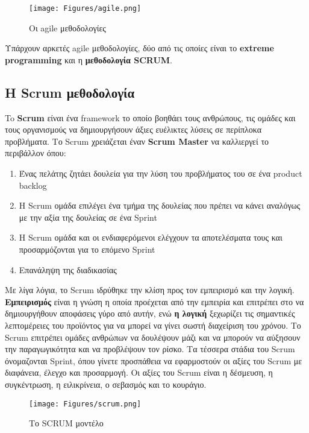 \begin{figure}[th]
    \centering
    \texttt{[image: Figures/agile.png]}
    \caption[Οι agile μεθοδολογίες]{Οι agile μεθοδολογίες}
    \label{fig:agile}
\end{figure}

Υπάρχουν αρκετές agile μεθοδολογίες, δύο από τις οποίες είναι το \textbf{extreme programming} και η \textbf{μεθοδολογία SCRUM}.

\subsection{Η Scrum μεθοδολογία}

To \textbf{Scrum} είναι ένα framework το οποίο βοηθάει τους ανθρώπους, τις ομάδες και τους οργανισμούς να δημιουργήσουν άξιες ευέλικτες λύσεις σε περίπλοκα προβλήματα. 
Το Scrum χρειάζεται έναν \textbf{Scrum Master} να καλλιεργεί το περιβάλλον όπου:

\begin{enumerate}
    \item Ένας πελάτης ζητάει δουλεία για την λύση του προβλήματος του σε ένα product backlog
    \item Η Scrum ομάδα επιλέγει ένα τμήμα της δουλείας που πρέπει να κάνει αναλόγως με την αξία της δουλείας σε ένα Sprint
    \item Η Scrum ομάδα και οι ενδιαφερόμενοι ελέγχουν τα αποτελέσματα τους και προσαρμόζονται για το επόμενο Sprint
    \item Επανάληψη της διαδικασίας
\end{enumerate}

Με λίγα λόγια, το Scrum ιδρύθηκε την κλίση προς τον εμπειρισμό και την λογική. 
\textbf{Εμπειρισμός} είναι η γνώση η οποία προέχεται από την εμπειρία και επιτρέπει στο να δημιουργήθουν αποφάσεις γύρο από αυτήν, ενώ \textbf{η λογική} ξεχωρίζει τις σημαντικές λεπτομέρειες του προϊόντος για να μπορεί να γίνει σωστή διαχείριση του χρόνου.
Το Scrum επιτρέπει ομάδες ανθρώπων να δουλέψουν μάζι και να μπορούν να αύξησουν την παραγωγικότητα και να προβλέψουν τον ρίσκο.
Τα τέσσερα στάδια του Scrum όνομαζονται Sprint, όπου γίνετε προσπάθεια να εφαρμοστούν οι αξίες του Scrum με διαφάνεια, έλεγχο και προσαρμογή.
Οι αξίες του Scrum είναι η δέσμευση, η συγκέντρωση, η ειλικρίνεια, ο σεβασμός και το κουράγιο.

\begin{figure}[th]
    \centering
    \texttt{[image: Figures/scrum.png]}
    \caption[Το SCRUM μοντέλο]{Το SCRUM μοντέλο}
    \label{fig:scrum}
\end{figure}

